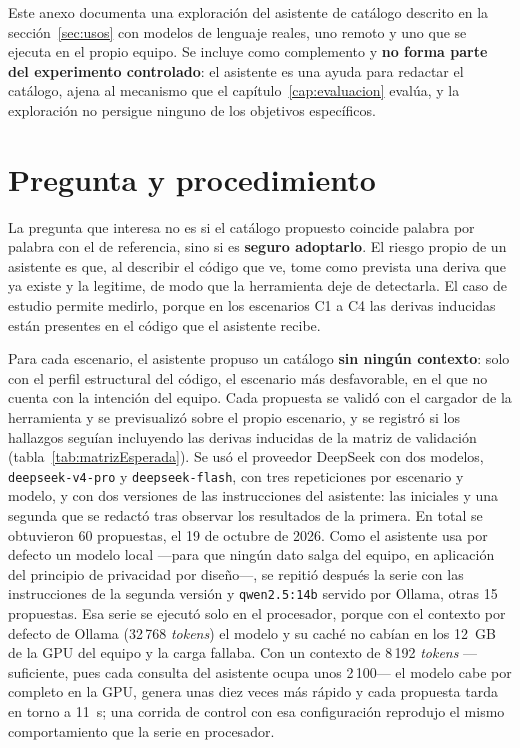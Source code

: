 \label{anexo:asistente}

Este anexo documenta una exploración del asistente de catálogo descrito en la sección~\ref{sec:usos} con modelos de lenguaje reales, uno remoto y uno que se ejecuta en el propio equipo. Se incluye como complemento y \textbf{no forma parte del experimento controlado}: el asistente es una ayuda para redactar el catálogo, ajena al mecanismo que el capítulo~\ref{cap:evaluacion} evalúa, y la exploración no persigue ninguno de los objetivos específicos.

\section{Pregunta y procedimiento}
La pregunta que interesa no es si el catálogo propuesto coincide palabra por palabra con el de referencia, sino si es \textbf{seguro adoptarlo}. El riesgo propio de un asistente es que, al describir el código que ve, tome como prevista una deriva que ya existe y la legitime, de modo que la herramienta deje de detectarla. El caso de estudio permite medirlo, porque en los escenarios C1 a C4 las derivas inducidas están presentes en el código que el asistente recibe.

Para cada escenario, el asistente propuso un catálogo \textbf{sin ningún contexto}: solo con el perfil estructural del código, el escenario más desfavorable, en el que no cuenta con la intención del equipo. Cada propuesta se validó con el cargador de la herramienta y se previsualizó sobre el propio escenario, y se registró si los hallazgos seguían incluyendo las derivas inducidas de la matriz de validación (tabla~\ref{tab:matrizEsperada}). Se usó el proveedor DeepSeek con dos modelos, \texttt{deepseek-v4-pro} y \texttt{deepseek-flash}, con tres repeticiones por escenario y modelo, y con dos versiones de las instrucciones del asistente: las iniciales y una segunda que se redactó tras observar los resultados de la primera. En total se obtuvieron 60 propuestas, el 19 de octubre de 2026. Como el asistente usa por defecto un modelo local ---para que ningún dato salga del equipo, en aplicación del principio de privacidad por diseño---, se repitió después la serie con las instrucciones de la segunda versión y \texttt{qwen2.5:14b} servido por Ollama, otras 15 propuestas. Esa serie se ejecutó solo en el procesador, porque con el contexto por defecto de Ollama (32\,768 \textit{tokens}) el modelo y su caché no cabían en los 12~GB de la GPU del equipo y la carga fallaba. Con un contexto de 8\,192 \textit{tokens} ---suficiente, pues cada consulta del asistente ocupa unos 2\,100--- el modelo cabe por completo en la GPU, genera unas diez veces más rápido y cada propuesta tarda en torno a 11~s; una corrida de control con esa configuración reprodujo el mismo comportamiento que la serie en procesador.

